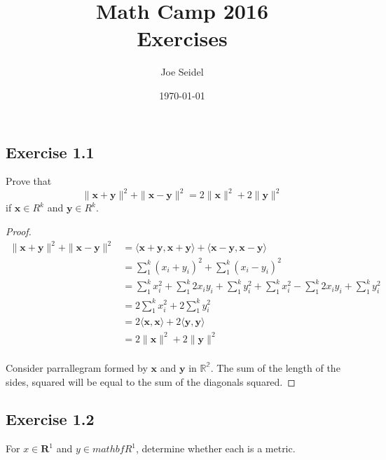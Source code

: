 \documentclass{tufte-book}
\title{Math Camp 2016\\Exercises }
\author{Joe Seidel}
\date{\today}
\newcommand{\vct}{\mathbf}
\newcommand{\dprod}[2]{\langle \vct{#1}, \vct{#2} \rangle}
\theoremstyle{mytheoremstyle}
\theoremstyle{mylemstyle}
\theoremstyle{mydefstyle}
\begin{document}
\maketitle
{}
\newpage
{}

\subsection{Exercise 1.1}
Prove that
\[ \| \vct{x} +\vct{y} \|^2 + \|\vct{x}-\vct{y}\|^2 = 2\|\vct{x}\|^2 + 2\|\vct{y}\|^2 \]
if $\vct{x} \in R^k$ and $\vct{y} \in R^k$.

\begin{proof}\marginnote{\it{norm}: $\|x\| = (\dprod{x}{x})^{\frac{1}{2}}$}
\begin{align*}
\| \vct{x} +\vct{y} \|^2 + \|\vct{x}-\vct{y}\|^2 &=  \dprod{x+y}{x+y} + \dprod{x-y}{x-y} \\
&= \sum_1^k(x_i+y_i)^2 + \sum_1^k(x_i - y_i)^2\\
&= \sum_1^k x_i^2 + \sum_1^k 2x_iy_i + \sum_1^k y_i^2 + \sum_1^k x_i^2 - \sum_1^k 2x_iy_i + \sum_1^k y_i^2 \\
&=  2\sum_1^k x_i^2 + 2\sum_1^k y_i^2\\
&= 2\dprod{x}{x} + 2\dprod{y}{y}\\
&= 2\|\vct{x}\|^2 + 2\|\vct{y}\|^2\\
\end{align*}

Consider parrallegram formed by $\vct{x}$ and $\vct{y}$ in $\mathbb{R^2}$. The sum of the length of the sides, squared will be equal to the sum of the diagonals squared.

\end{proof}

\subsection{Exercise 1.2}
For $x \in \mathbf{R}^1$ and $y \in mathbf{R}^1$, determine whether each is a metric.
\end{document}
